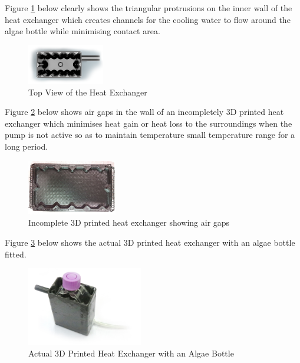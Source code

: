 \documentclass[10pt,a4paper]{IEEEtran}
\begin{document}
 	Figure \ref{fig:heat_exchanger_top} below clearly shows the triangular protrusions on the inner wall of the heat exchanger which creates channels for the cooling water to flow around the algae bottle while minimising contact area.
 	
 		\begin{figure}[H]
 			\begin{center}
 				\includegraphics[width=0.3\textwidth]{heat_exchanger_top.png}
 				\caption{Top View of the Heat Exchanger}
 				\label{fig:heat_exchanger_top}
 			\end{center}
 		\end{figure}
 	Figure \ref{fig:air_gaps} below shows air gaps in the wall of an incompletely 3D printed heat exchanger which minimises heat gain or heat loss to the surroundings when the pump is not active so as to maintain temperature small temperature range for a long period.
 		\begin{figure}[H]
 			\begin{center}
 				\includegraphics[width=0.35\textwidth]{air_gaps.jpeg}
 				\caption{Incomplete 3D printed heat exchanger showing air gaps}
 				\label{fig:air_gaps}
 			\end{center}
 		\end{figure}
 	Figure \ref{fig:actual_heatExchanger} below shows the actual 3D printed heat exchanger with an algae bottle fitted.
 		\begin{figure}[H]
 			\begin{center}
 				\includegraphics[width=0.45\textwidth]{image_heatExchanger.jpg}
 				\caption{Actual 3D Printed Heat Exchanger with an Algae Bottle}
 				\label{fig:actual_heatExchanger}
 			\end{center}
 		\end{figure}
	 
\end{document}
